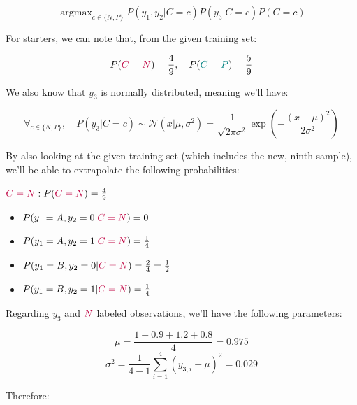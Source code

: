 \documentclass[12pt]{article}
\begin{document}
\begin{enumerate}[leftmargin=\labelsep]
        \begin{equation} \label{eq:argmax}
          \operatorname{argmax}_{c \in \{N, P\}} P(y_1, y_2 | C = c) P(y_3 | C = c) P(C = c)
        \end{equation}

        For starters, we can note that, from the given training set:

        $$
          P(\textcolor{purple}{C = N}) = \frac{4}{9}, \quad P(\textcolor{teal}{C = P}) = \frac{5}{9}
        $$

        We also know that $y_3$ is normally distributed, meaning we'll have:

        $$
          \forall_{c \in \{N, P\}},\quad P(y_3 | C = c) \sim \mathcal{N}(x | \mu, \sigma^2) = \frac{1}{\sqrt{2 \pi \sigma^2}} \exp \left( - \frac{(x - \mu)^2}{2 \sigma^2} \right)
        $$

        By also looking at the given training set (which includes the new, ninth sample), we'll be able
        to extrapolate the following probabilities:

        \pagebreak

        \begin{multicols}{2}
          \setlength{\columnseprule}{1pt}
          \def\columnseprulecolor{\color{black}}
          \centering
          $\textcolor{purple}{C = N}: P(\textcolor{purple}{C = N}) = \frac{4}{9}$
          \begin{itemize}
            \item $P(y_1 = A, y_2 = 0 | \textcolor{purple}{C = N}) = 0$
            \item $P(y_1 = A, y_2 = 1 | \textcolor{purple}{C = N}) = \frac{1}{4}$
            \item $P(y_1 = B, y_2 = 0 | \textcolor{purple}{C = N}) = \frac{2}{4} = \frac{1}{2}$
            \item $P(y_1 = B, y_2 = 1 | \textcolor{purple}{C = N}) = \frac{1}{4}$
          \end{itemize}
          Regarding $y_3$ and $\textcolor{purple}{N}$ labeled observations, we'll have the following parameters:

          \vspace{-0.6cm}

          $$
            \mu = \frac{1 + 0.9 + 1.2 + 0.8}{4} = 0.975
          $$
          $$
            \sigma^2 = \frac{1}{4 - 1} \sum_{i = 1}^4 (y_{3, i} - \mu)^2 = 0.029
          $$

          Therefore:


\end{multicols}
\end{enumerate}
\end{document}
